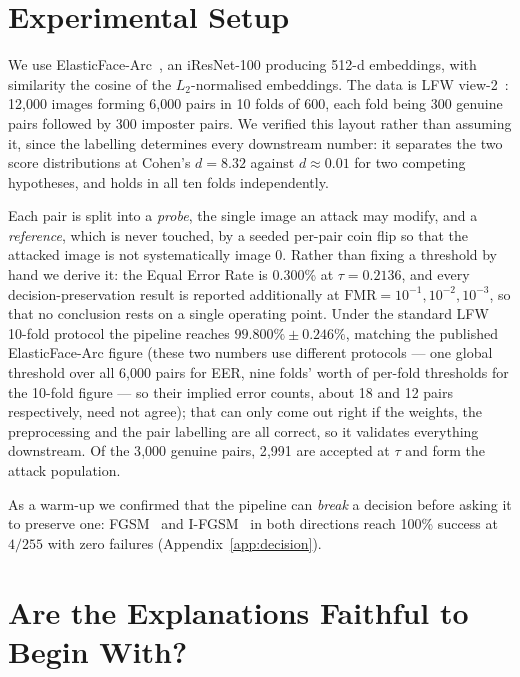 \documentclass[conference,10pt]{IEEEtran}
\begin{document}
\section{Experimental Setup}
\label{sec:setup}

We use ElasticFace-Arc~\cite{boutros2022elasticface}, an iResNet-100 producing 512-d
embeddings, with similarity the cosine of the $L_2$-normalised embeddings. The data is LFW
view-2~\cite{huang2007lfw}: 12{,}000 images forming 6{,}000 pairs in 10 folds of 600, each
fold being 300 genuine pairs followed by 300 imposter pairs. We verified this layout rather
than assuming it, since the labelling determines every downstream number: it separates the two
score distributions at Cohen's $d = 8.32$ against $d \approx 0.01$ for two competing
hypotheses, and holds in all ten folds independently.

Each pair is split into a \emph{probe}, the single image an attack may modify, and a
\emph{reference}, which is never touched, by a seeded per-pair coin flip so that the attacked
image is not systematically image 0. Rather than fixing a
threshold by hand we derive it: the Equal Error Rate is 0.300\% at $\tau = 0.2136$, and every
decision-preservation result is reported additionally at $\mathrm{FMR} = 10^{-1}, 10^{-2},
10^{-3}$, so that no conclusion rests on a single operating point. Under the standard LFW
10-fold protocol the pipeline reaches $99.800\% \pm 0.246\%$, matching the published
ElasticFace-Arc figure (these two numbers use different protocols — one global threshold over
all 6{,}000 pairs for EER, nine folds' worth of per-fold thresholds for the 10-fold figure — so
their implied error counts, about 18 and 12 pairs respectively, need not agree); that can only
come out right if the weights, the preprocessing and the pair labelling are all correct, so it
validates everything downstream. Of the 3{,}000 genuine
pairs, 2{,}991 are accepted at $\tau$ and form the attack population.

As a warm-up we confirmed that the pipeline can \emph{break} a decision before asking it to
preserve one: FGSM~\cite{goodfellow2015fgsm} and I-FGSM~\cite{kurakin2017physical} in both
directions reach 100\% success at $4/255$ with zero failures (Appendix~\ref{app:decision}).

\section{Are the Explanations Faithful to Begin With?}
\label{sec:faith}
\end{document}
